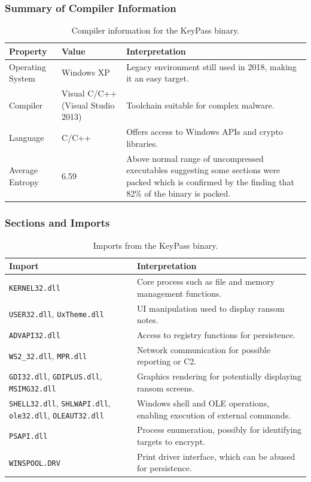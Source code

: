\documentclass{article}
\begin{document}
\subsubsection{Summary of Compiler Information}
\begin{table}[H]
  \centering
  \begin{tabular}{|p{2cm}|p{2cm}|p{6cm}|}
    \hline
    \textbf{Property} & \textbf{Value} & \textbf{Interpretation} \\
    \hline
    Operating System & Windows XP & Legacy environment still used in 2018, making it an easy target. \\
    \hline
    Compiler & Visual C/C++ (Visual Studio 2013) & Toolchain suitable for complex malware. \\
    \hline
    Language & C/C++ & Offers access to Windows APIs and crypto libraries. \\
    \hline
    Average Entropy & 6.59 & Above normal range of uncompressed executables suggesting some sections were packed which is confirmed by the finding that 82\% of the binary is packed.\\
    \hline
  \end{tabular}
  \caption{Compiler information for the KeyPass binary.}
  \label{tab:keypass-compiler}
\end{table}

\subsubsection{Sections and Imports}
\begin{table}[H]
  \centering
  \begin{tabular}{|p{3cm}|p{6cm}|}
    \hline
    \textbf{Import} & \textbf{Interpretation} \\
    \hline
    \texttt{KERNEL32.dll} & Core process such as file and memory management functions. \\
    \hline
    \texttt{USER32.dll}, \texttt{UxTheme.dll} & UI manipulation used to display ransom notes. \\
    \hline
    \texttt{ADVAPI32.dll} & Access to registry functions for persistence. \\
    \hline
    \texttt{WS2\_32.dll}, \texttt{MPR.dll} & Network communication for possible reporting or C2. \\
    \hline
    \texttt{GDI32.dll}, \texttt{GDIPLUS.dll}, \texttt{MSIMG32.dll} & Graphics rendering for potentially displaying ransom screens. \\
    \hline
    \texttt{SHELL32.dll}, \texttt{SHLWAPI.dll}, \texttt{ole32.dll}, \texttt{OLEAUT32.dll} & Windows shell and OLE operations, enabling execution of external commands. \\
    \hline
    \texttt{PSAPI.dll} & Process enumeration, possibly for identifying targets to encrypt. \\
    \hline
    \texttt{WINSPOOL.DRV} & Print driver interface, which can be abused for persistence. \\
    \hline
  \end{tabular}
  \caption{Imports from the KeyPass binary.}
  \label{tab:keypass-imports}
\end{table}
\end{document}

